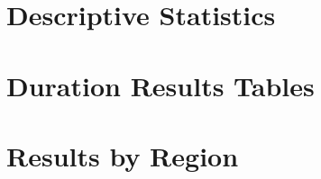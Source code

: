 \documentclass[12pt,letterpaper]{article}
\begin{document}
\clearpage
\newpage

\section{Descriptive Statistics}
\setcounter{figure}{0}
\setcounter{table}{0}




\clearpage
\newpage



\section{Duration Results Tables}

\setcounter{figure}{0}
\setcounter{table}{0}

\vspace*{-0.51cm}














\clearpage


\section{Results by Region}

\setcounter{figure}{0}
\setcounter{table}{0}

\vspace*{-0.51cm}












\end{document}

